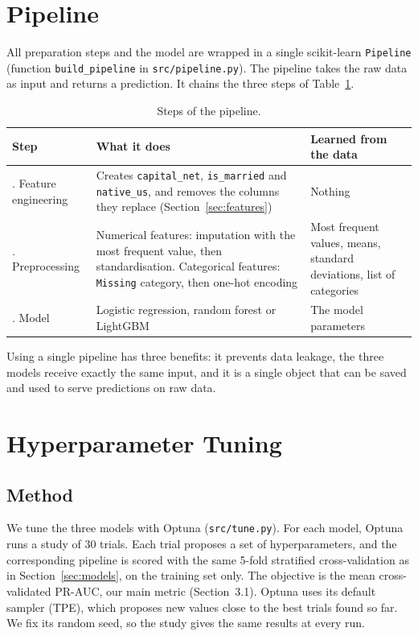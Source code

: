 \documentclass[10pt,a4paper]{article}
\begin{document}
\section{Pipeline}
\label{sec:pipeline}
All preparation steps and the model are wrapped in a single scikit-learn
\texttt{Pipeline} (function \texttt{build\_pipeline} in \texttt{src/pipeline.py}). The
pipeline takes the raw data as input and returns a prediction. It chains the three steps
of Table~\ref{tab:pipeline}.

\begin{table}[htbp]
\centering
\caption{Steps of the pipeline.}
\label{tab:pipeline}
\small
\begin{tabular}{>{\raggedright\arraybackslash}p{3.3cm}>{\raggedright\arraybackslash}p{7.4cm}>{\raggedright\arraybackslash}p{3.6cm}}
\toprule
Step & What it does & Learned from the data \\
\midrule
1. Feature engineering & Creates \texttt{capital\_net}, \texttt{is\_married} and
\texttt{native\_us}, and removes the columns they replace (Section~\ref{sec:features}) &
Nothing \\
\addlinespace
2. Preprocessing & Numerical features: imputation with the most frequent value, then
standardisation. Categorical features: \texttt{Missing} category, then one-hot encoding &
Most frequent values, means, standard deviations, list of categories \\
\addlinespace
3. Model & Logistic regression, random forest or LightGBM & The model parameters \\
\bottomrule
\end{tabular}
\end{table}

Using a single pipeline has three benefits: it prevents data leakage, the three models receive exactly the same input, and it is a single object that can be saved and used to serve
predictions on raw data.

\section{Hyperparameter Tuning}
\label{sec:tuning}

\subsection{Method}
We tune the three models with Optuna (\texttt{src/tune.py}). For each model, Optuna runs
a study of 30 trials. Each trial proposes a set of hyperparameters, and the
corresponding pipeline is scored with the same 5-fold stratified cross-validation as in
Section~\ref{sec:models}, on the training set only. The objective is the mean
cross-validated PR-AUC, our main metric (Section~3.1). Optuna uses its default sampler
(TPE), which proposes new values close to the best trials found so far. We fix its random
seed, so the study gives the same results at every run.
\end{document}
